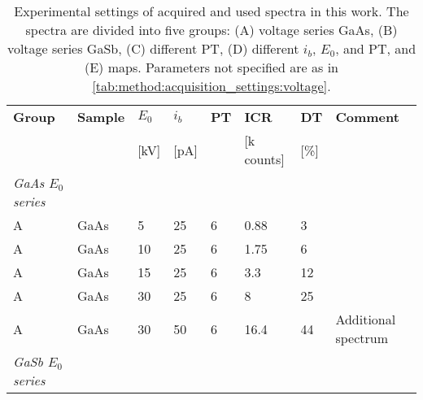 \begin{table}[phtb]
    \begin{center}
        \caption{
            Experimental settings of acquired and used spectra in this work.
            The spectra are divided into five groups: (A) voltage series GaAs, (B) voltage series GaSb, (C) different PT, (D) different $i_b$, $E_0$, and PT, and (E) maps.
            Parameters not specified are as in \cref{tab:method:acquisition_settings:voltage}.
        }
        \renewcommand*{\arraystretch}{1.2}
        \label{tab:method:acquisition_settings:all_spectra}
        \begin{tabular}{lllllllp{3.5cm}}
            \hline
            \textbf{Group}             & \textbf{Sample} & \textbf{$E_0$} & \textbf{$i_b$} & \textbf{PT} & \textbf{ICR} & \textbf{DT} & \textbf{Comment}    \\
                                       &                 & [kV]           & [pA]           &             & [k counts]   & [\%]        &                     \\
            \hline
            \emph{GaAs $E_0$ series}   &                 &                &                &             &              &             &                     \\
            A                          & GaAs            & 5              & 25             & 6           & 0.88         & 3           &                     \\
            A                          & GaAs            & 10             & 25             & 6           & 1.75         & 6           &                     \\
            A                          & GaAs            & 15             & 25             & 6           & 3.3          & 12          &                     \\
            A                          & GaAs            & 30             & 25             & 6           & 8            & 25          &                     \\
            A                          & GaAs            & 30             & 50             & 6           & 16.4         & 44          & Additional spectrum \\
            \hline
            \emph{GaSb $E_0$ series  } &                 &                &                &             &              &             &                     \\

\end{tabular}
\end{center}
\end{table}
